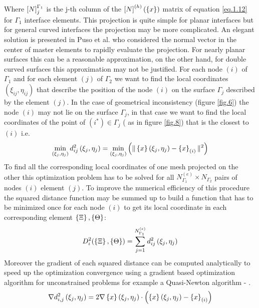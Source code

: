      Where $\left[{N}\right]_{j}^{\Gamma_1}$ is the j-th column of the $\left[{N}\right]^{(h)}(\left\lbrace{x}\right \rbrace)$ matrix of equation \eqref{eq.1.12} for ${\Gamma_1}$ interface elements. This projection is quite simple for planar interfaces but for general curved interfaces the projection may be more complicated. An elegant solution is presented in Puso et al. \cite{puso20043d} who considered the normal vector in the center of master elements to rapidly evaluate the projection. For nearly planar surfaces this can be a reasonable approximation, on the other hand, for double curved surfaces this approximation may not be justified.
     For each node $(i)$ of $\Gamma_1$ and for each element $(j)$ of $\Gamma_2$ we want to find the local coordinates $(\xi_{ij},\eta_{ij})$ that describe the position of the node $(i)$ on the surface $\Gamma_j$ described by the element $(j)$. In the case of geometrical inconsistency (figure \ref{fig.6}) the node $(i)$ may not lie on the surface $\Gamma_j$, in that case we want to find the local coordinates of the point of $(i^*) \in \Gamma_j$ ( as in figure \ref{fig.8}) that is the closest to $(i)$ i.e.
     \begin{equation}
     \label{eq.43}
     \min_{\left(\xi_{j},\eta_{j}\right)}d^2_{ij}\left(\xi_{j},\eta_{j}\right)=\min_{\left(\xi_{j},\eta_{j}\right)}\left( \|\left\lbrace{x}\right \rbrace\left(\xi_{j},\eta_{j}\right)-\left\lbrace{x}\right \rbrace_{(i)} \|^2\right)
     \end{equation}
     To find all the corresponding local coordinates of one mesh projected on the other this optimization problem has to be solved for all $N^{(e)}_{\Gamma_1}\times N_{\Gamma_2}$ pairs of nodes $(i)$ element $(j)$. To improve the numerical efficiency of this procedure the squared distance function may be summed up to build a function that has to be minimized once for each node $(i)$ to get its local coordinate in each corresponding element $\left\lbrace{\Xi}\right \rbrace,\left\lbrace{\Theta}\right \rbrace$:
     \begin{equation}
     \label{eq.44}
     D_{i}^2(\left\lbrace{\Xi}\right \rbrace,\left\lbrace{\Theta}\right \rbrace)=\sum_{j=1}^{N^{(e)}_{\Gamma_1}}d^2_{ij}\left(\xi_{j},\eta_{j}\right)
     \end{equation}
     Moreover the gradient of each squared distance can be computed analytically to speed up the optimization convergence using a gradient based optimization algorithm for unconstrained problems for example a Quasi-Newton algorithm \cite{dennis1977quasi,davidon1959aec}- \cite{fletcher1963rapidly,dennis1996numerical}.
     \begin{equation}
     \label{eq.45}
     \nabla d_{i,j}^2 \left(\xi_{j},\eta_{j}\right)=2\nabla\left\lbrace{x}\right \rbrace\left(\xi_{j},\eta_{j}\right)\cdot\left( \left\lbrace{x}\right \rbrace\left(\xi_{j},\eta_{j}\right)-\left\lbrace{x}\right \rbrace_{(i)}\right)
     \end{equation}
